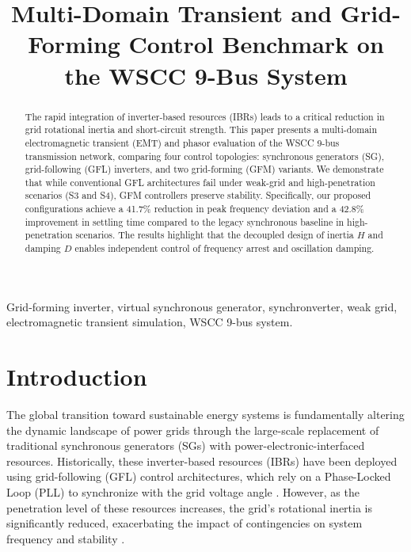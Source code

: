 \documentclass[conference]{IEEEtran}
\begin{document}
\title{Multi-Domain Transient and Grid-Forming Control Benchmark on the WSCC 9-Bus System}

\author{
}

\maketitle

\begin{abstract}
The rapid integration of inverter-based resources (IBRs) leads to a critical reduction in grid rotational inertia and short-circuit strength. This paper presents a multi-domain electromagnetic transient (EMT) and phasor evaluation of the WSCC 9-bus transmission network, comparing four control topologies: synchronous generators (SG), grid-following (GFL) inverters, and two grid-forming (GFM) variants. We demonstrate that while conventional GFL architectures fail under weak-grid and high-penetration scenarios (S3 and S4), GFM controllers preserve stability. Specifically, our proposed configurations achieve a 41.7\% reduction in peak frequency deviation and a 42.8\% improvement in settling time compared to the legacy synchronous baseline in high-penetration scenarios. The results highlight that the decoupled design of inertia $H$ and damping $D$ enables independent control of frequency arrest and oscillation damping.
\end{abstract}

\begin{IEEEkeywords}
Grid-forming inverter, virtual synchronous generator, synchronverter, weak grid, electromagnetic transient simulation, WSCC 9-bus system.
\end{IEEEkeywords}

\section{Introduction}\label{sec:intro}
The global transition toward sustainable energy systems is fundamentally altering the dynamic landscape of power grids through the large-scale replacement of traditional synchronous generators (SGs) with power-electronic-interfaced resources. Historically, these inverter-based resources (IBRs) have been deployed using grid-following (GFL) control architectures, which rely on a Phase-Locked Loop (PLL) to synchronize with the grid voltage angle \cite{PLL_Sync_Instability}. However, as the penetration level of these resources increases, the grid’s rotational inertia is significantly reduced, exacerbating the impact of contingencies on system frequency and stability \cite{Reduced_Inertia_Impact}.
\end{document}
